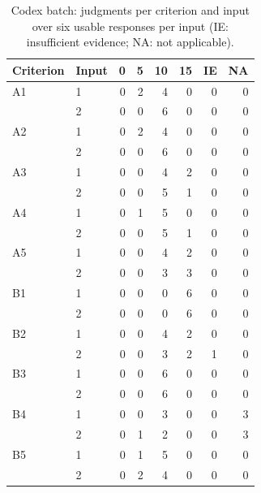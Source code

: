 \begin{table}[t]
\caption{Codex batch: judgments per criterion and input over six usable responses per input (IE: insufficient evidence; NA: not applicable).}
\label{tab:ratings-codex}
\centering\small\begin{tabular}{llrrrrrr}\toprule
Criterion & Input & 0 & 5 & 10 & 15 & IE & NA \\
\midrule
A1 & 1 & 0 & 2 & 4 & 0 & 0 & 0 \\
 & 2 & 0 & 0 & 6 & 0 & 0 & 0 \\
A2 & 1 & 0 & 2 & 4 & 0 & 0 & 0 \\
 & 2 & 0 & 0 & 6 & 0 & 0 & 0 \\
A3 & 1 & 0 & 0 & 4 & 2 & 0 & 0 \\
 & 2 & 0 & 0 & 5 & 1 & 0 & 0 \\
A4 & 1 & 0 & 1 & 5 & 0 & 0 & 0 \\
 & 2 & 0 & 0 & 5 & 1 & 0 & 0 \\
A5 & 1 & 0 & 0 & 4 & 2 & 0 & 0 \\
 & 2 & 0 & 0 & 3 & 3 & 0 & 0 \\
B1 & 1 & 0 & 0 & 0 & 6 & 0 & 0 \\
 & 2 & 0 & 0 & 0 & 6 & 0 & 0 \\
B2 & 1 & 0 & 0 & 4 & 2 & 0 & 0 \\
 & 2 & 0 & 0 & 3 & 2 & 1 & 0 \\
B3 & 1 & 0 & 0 & 6 & 0 & 0 & 0 \\
 & 2 & 0 & 0 & 6 & 0 & 0 & 0 \\
B4 & 1 & 0 & 0 & 3 & 0 & 0 & 3 \\
 & 2 & 0 & 1 & 2 & 0 & 0 & 3 \\
B5 & 1 & 0 & 1 & 5 & 0 & 0 & 0 \\
 & 2 & 0 & 2 & 4 & 0 & 0 & 0 \\
\bottomrule\end{tabular}
\end{table}
